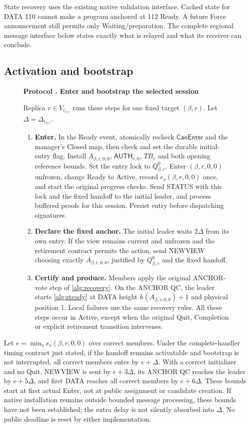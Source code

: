 \documentclass[11pt,a4paper]{article}
\newcommand{\TB}{\mathit{TB}}
\newcommand{\tagg}[1]{\ensuremath{\mathsf{#1}}}
\newcounter{protocol}
\newenvironment{protocol}[3][htbp]{\begin{figure}[#1]\refstepcounter{protocol}\label{#2}
\begin{mdframed}[linewidth=.6pt,skipabove=0pt,skipbelow=0pt,
innertopmargin=7pt,innerbottommargin=7pt]\small
\textbf{Protocol \theprotocol. #3}\par\smallskip}{\end{mdframed}\end{figure}}
\begin{document}
State recovery uses the existing native validation interface. Cached state
for DATA 110 cannot make a program anchored at 112 Ready. A future Force
announcement still permits only Waiting/preparation. The complete regional
message interface below states exactly what is relayed and what its
receiver can conclude.



\subsection{Activation and bootstrap}
\label{sec:ready}
\begin{protocol}[H]{alg:bootstrap}{Enter and bootstrap the selected session}
Replica $v\in V_{i_{\beta,r}}$ runs these steps for one fixed target
$(\beta,r)$. Let $\Delta=\Delta_{i_{\beta,r}}$.
\begin{enumerate}[label=\textbf{\arabic*)},itemsep=3pt]
\item \textbf{Enter.} In the Ready event, atomically recheck
$\tagg{CanEnter}$ and the manager's Closed map, then check and set
the durable initial-entry flag. Install $A_{\beta,r,0,0}$,
$\tagg{AUTH}_{r,0}$, $\TB_r$ and both opening reference bounds.
Set the entry lock to $Q^0_{\beta,r}$. Enter $(\beta,r,0,0)$
unfrozen, change Ready to Active, record $e_v(\beta,r,0,0)$ once,
and start the original progress checks. Send STATUS with this lock
and the fixed handoff to the initial leader, and process buffered
proofs for this session. Persist entry before dispatching signatures.
\item \textbf{Declare the fixed anchor.} The initial leader waits
$2\Delta$ from its own entry. If the view remains current and
unfrozen and the retirement contract permits the action, send NEWVIEW
choosing exactly $A_{\beta,r,0,0}$, justified by $Q^0_{\beta,r}$
and the fixed handoff.
\item \textbf{Certify and produce.} Members apply the original
ANCHOR-vote step of \cref{alg:recovery}. On the ANCHOR QC, the leader
starts \cref{alg:steady} at DATA height $h(A_{\beta,r,0,0})+1$
and physical position 1. Local failures use the same recovery rules.
All these steps occur in Active, except when the original Quit,
Completion or explicit retirement transition intervenes.
\end{enumerate}
\end{protocol}

Let $e=\min_v e_v(\beta,r,0,0)$ over correct members. Under the
complete-handler timing contract just stated, if the handoff remains
activatable and bootstrap is not interrupted, all correct members enter
by $e+\Delta$. With a correct initializer and no Quit, NEWVIEW is sent
by $e+3\Delta$, its ANCHOR QC reaches the leader by $e+5\Delta$, and
first DATA reaches all correct members by $e+6\Delta$. These bounds
start at first actual Enter, not at public assignment or candidate creation.
If native installation remains outside bounded message processing, these
bounds have not been established; the extra delay is not silently absorbed
into $\Delta$. No public deadline is reset by either implementation.
\end{document}
